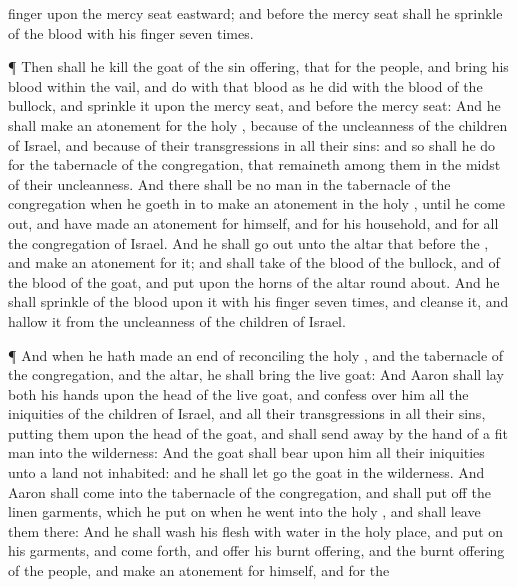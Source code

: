 {finger upon the mercy
seat
eastward; and
before the mercy
seat shall he
sprinkle of the
blood with his
finger
seven
times.
\par }{\PP {}¶ Then shall he
kill the
goat of the sin
offering, that
{} for the
people, and
bring his
blood
within the
vail, and
do with that
blood as he
did with the
blood of the
bullock, and
sprinkle it upon the mercy
seat, and
before the mercy
seat:
And he shall make an
atonement for the
holy
{}, because of the
uncleanness of the
children of
Israel, and because of their
transgressions in all their
sins: and so shall he
do for the
tabernacle of the
congregation, that
remaineth among them in the
midst of their
uncleanness.
And there shall be no
man in the
tabernacle of the
congregation when he
goeth in to make an
atonement in the
holy
{}, until he come
out, and have made an
atonement for himself, and for his
household, and for all the
congregation of
Israel.
And he shall go
out unto the
altar that
{}
before the
{}, and make an
atonement for it; and shall
take of the
blood of the
bullock, and of the
blood of the
goat, and
put
{} upon the
horns of the
altar round
about.
And he shall
sprinkle of the
blood upon it with his
finger
seven
times, and
cleanse it, and
hallow it from the
uncleanness of the
children of
Israel.
\par }{\PP {}¶ And when he hath made an
end of
reconciling the
holy
{}, and the
tabernacle of the
congregation, and the
altar, he shall
bring the
live
goat:
And
Aaron shall
lay
both his
hands upon the
head of the
live
goat, and
confess over him all the
iniquities of the
children of
Israel, and all their
transgressions in all their
sins,
putting them upon the
head of the
goat, and shall send
{}
away by the
hand of a
fit
man into the
wilderness:
And the
goat shall
bear upon him all their
iniquities unto a
land not
inhabited: and he shall let
go the
goat in the
wilderness.
And
Aaron shall
come into the
tabernacle of the
congregation, and shall put
off the
linen
garments, which he put
on when he
went into the
holy
{}, and shall
leave them there:
And he shall
wash his
flesh with
water in the
holy
place, and put
on his
garments, and come
forth, and
offer his burnt
offering, and the burnt
offering of the
people, and make an
atonement for himself, and for the
}

